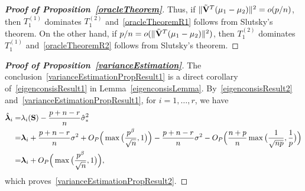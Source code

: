 \documentclass[3p]{elsarticle}
\newcommand{\bfsym}[1]{\ensuremath{\boldsymbol{#1}}}
\def\blambda {\bfsym {\lambda}}        \def\bLambda {\bfsym {\Lambda}}
\theoremstyle{plain}
\theoremstyle{definition}
\theoremstyle{remark}
\begin{document}
\begin{appendices}
\begin{proof}[\textbf{Proof of Proposition~\ref{oracleTheorem}}]
    Thus, if $\|\tilde{\mathbf{V}}^T (\mu_1-\mu_2)\|^2=o(p/n)$, then $T_1^{(1)}$ dominates $T_1^{(2)}$ and~\eqref{oracleTheoremR1} follows from Slutsky's theorem.
    On the other hand, if  $p/n= o(\|\tilde{\mathbf{V}}^T(\mu_1-\mu_2)\|^2)$, then $T_1^{(2)}$ dominates $T_1^{(1)}$ and~\eqref{oracleTheoremR2} follows from Slutsky's theorem.
\end{proof}



\begin{proof}[\textbf{Proof of Proposition~\ref{varianceEstimation}}]
    The conclusion~\eqref{varianceEstimationPropResult1} is a direct corollary of~\eqref{eigenconsisResult1} in Lemma~\ref{eigenconsisLemma}.
    By~\eqref{eigenconsisResult2} and~\eqref{varianceEstimationPropResult1}, for $i=1,\ldots, r$, we have 
    $$
    \begin{aligned}
        \hat{\blambda}_i=&
        \lambda_i(\BS)-\frac{p+n-r}{n}\hat{\sigma}_*^2\\
        =& \blambda_i +\frac{p+n-r}{n}\sigma^2+O_P\Big(\max\big(\frac{p^{\beta}}{\sqrt{n}},1\big)\Big)
        -\frac{p+n-r}{n}\sigma^2-O_P\Big( \frac{n+p}{n}\max\big(\frac{1}{\sqrt{np}},\frac{1}{p}\big)\Big)\\
        =& \blambda_i+O_P\Big(\max\big(\frac{p^{\beta}}{\sqrt{n}},1\big)\Big),
    \end{aligned}
    $$
    which proves~\eqref{varianceEstimationPropResult2}.
\end{proof}




\end{appendices}
\end{document}
